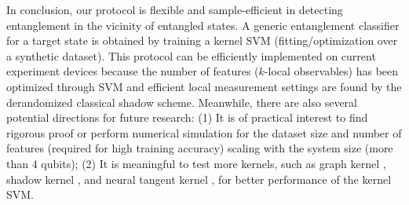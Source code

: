 \documentclass[
aps,
pra,
twocolumn,
floatfix,
]{revtex4-2}
\theoremstyle{plain}
\theoremstyle{definition}
\newcommand{\pob}{O}
\newcommand{\dm}{\rho}
\begin{document}
In conclusion,
our protocol is flexible and sample-efficient in detecting entanglement in the vicinity of entangled states.
A generic entanglement classifier for a target state is obtained by training a kernel SVM (fitting/optimization over a synthetic dataset).
This protocol can be efficiently implemented on current experiment devices because the number of features ($k$-local observables) has been optimized through SVM and efficient local measurement settings are found by the derandomized classical shadow scheme.
Meanwhile, there are also several potential directions for future research:
(1) It is of practical interest to find rigorous proof or perform numerical simulation for the dataset size and number of features (required for high training accuracy) scaling with the system size (more than 4 qubits);
(2) It is meaningful to test more kernels, such as graph kernel \cite{vishwanathanGraphKernels2010}, shadow kernel \cite{huangProvablyEfficientMachine2022}, and neural tangent kernel \cite{jacotNeuralTangentKernel2020}, for better performance of the kernel SVM.
\end{document}
